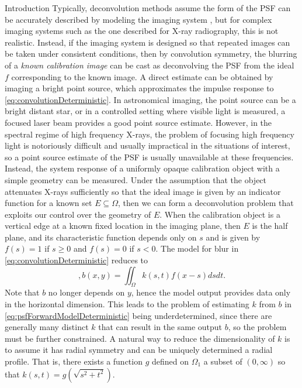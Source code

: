 \begin{chapter}{Introduction}
  Typically, deconvolution methods assume the form of the PSF can be accurately described by modeling the imaging system \citep{jain1989}, but for complex imaging systems such as the one described for X-ray radiography, this is not realistic.
  Instead, if the imaging system is designed so that repeated images can be taken under consistent conditions, then by convolution symmetry, the blurring of a \emph{known calibration image} can be cast as deconvolving the PSF from the ideal $f$ corresponding to the known image.
  A direct estimate can be obtained by imaging a bright point source, which approximates the impulse response to \eqref{eq:convolutionDeterministic}.
  In astronomical imaging, the point source can be a bright distant star, or in a controlled setting where visible light is measured, a focused laser beam provides a good point source estimate.
  However, in the spectral regime of high frequency X-rays, the problem of focusing high frequency light is notoriously difficult and usually impractical in the situations of interest, so a point source estimate of the PSF is usually unavailable at these frequencies.
  Instead, the system response of a uniformly opaque calibration object with a simple geometry can be measured.
  Under the assumption that the object attenuates X-rays sufficiently so that the ideal image is given by an indicator function for a known set $E \subseteq \Omega$, then we can form a deconvolution problem that exploits our control over the geometry of $E$.
  When the calibration object is a vertical edge at a known fixed location in the imaging plane, then $E$ is the half plane, and its characteristic function depends only on $s$ and is given by $f(s) = 1$ if $s\ge0$ and $f(s)=0$ if $s <0$. 
  The model for blur in \ref{eq:convolutionDeterministic} reduces to
\begin{equation}\label{eq:psfForwardModelDeterministic},
  b(x,y) = \iint_{\Omega} k(s,t) f(x-s)dsdt. 
\end{equation}
  Note that $b$ no longer depends on $y$, hence the model output provides data only in the horizontal dimension.
  This leads to the problem of estimating $k$ from $b$ in \eqref{eq:psfForwardModelDeterministic} being underdetermined, since there are generally many distinct $k$ that can result in the same output $b$, so the problem must be further constrained. 
  A natural way to reduce the dimensionality of $k$ is to assume it has radial symmetry and can be uniquely determined a radial profile.
  That is, there exists a function $g$ defined on $\Omega_1$ a subset of $(0,\infty)$ so that $k(s,t) = g(\sqrt{s^2 + t^2})$.  


\end{chapter}

